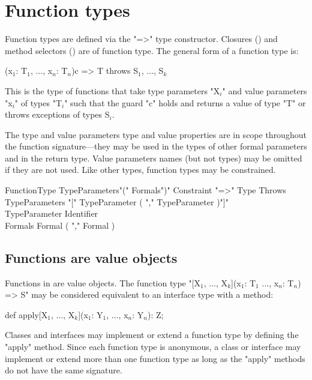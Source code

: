 \section{Function types}
\label{FunctionTypes}




        Function types are defined via the \xcd"=>" type
        constructor.  Closures () and method
        selectors () are of function type.
        The general form of a function type is:
\begin{xtenmath}
[X$_1$, $\dots$, X$_m$](x$_1$: T$_1$, $\dots$, x$_n$: T$_n$){c} => T
        throws S$_1$, $\dots$, S$_k$
\end{xtenmath}
        This
        is the type of functions that take type parameters
        \xcdmath"X$_i$"
        and value parameters
        \xcdmath"x$_i$"
        of types
        \xcdmath"T$_i$"
        such that the guard \xcd"c" holds
        and returns a value of type \xcd"T" or throws
        exceptions of 
        types S$_i$.

The
\iftypeparams
type and value parameters
\else
type and value properties
\fi
are in scope throughout the function signature---they may be
used
in the types of other formal parameters and in the return type.
Value parameters names (but not types) may be omitted if
they are not used. 
Like other types, function types may be constrained.

\begin{grammar}
FunctionType \: TypeParameters\opt \xcd"(" Formals\opt \xcd")" Constraint\opt
\xcd"=>" Type Throws\opt \\
TypeParameters \: \xcd"[" TypeParameter ( \xcd"," TypeParameter
)\star \xcd"]" \\
TypeParameter \: Identifier \\
Formals \: Formal ( \xcd"," Formal )\star \\
\end{grammar}

\subsection{Functions are value objects}
\label{FunctionsAreObjects}

Functions in \Xten{} are value objects.  
The function type
\xcdmath"[X$_1$, $\dots$, X$_k$](x$_1$: T$_1$ $\dots$, x$_n$: T$_n$) => S"
may be considered equivalent to an interface type
with a method:
\begin{xtenmath}
def apply[X$_1$, $\dots$, X$_k$](x$_1$: Y$_1$, $\dots$, x$_n$: Y$_n$): Z;
\end{xtenmath}
Classes and interfaces may implement or extend a function type
by defining the \xcd"apply" method.  Since each function type is 
anonymous, a class or interface may implement or extend
more than one function type as long as the \xcd"apply" methods
do not have the same signature.

